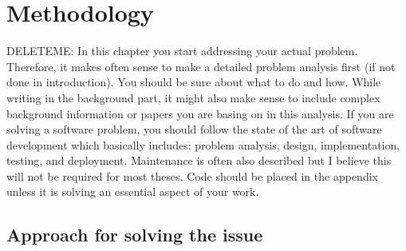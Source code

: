 \chapter{Methodology}
\label{mainone}
DELETEME: In this chapter you start addressing your actual problem. Therefore, it makes often sense to make a detailed problem analysis first (if not done in introduction). You should be sure about what to do and how. While writing in the background part, it might also make sense to include complex background information or papers you are basing on in this analysis. If you are solving a software problem, you should follow the state of the art of software development which basically includes: problem analysis, design, implementation, testing, and deployment. Maintenance is often also described but I believe this will not be required for most theses. Code should be placed in the appendix unless it is solving an essential aspect of your work.

\section{Approach for solving the issue}